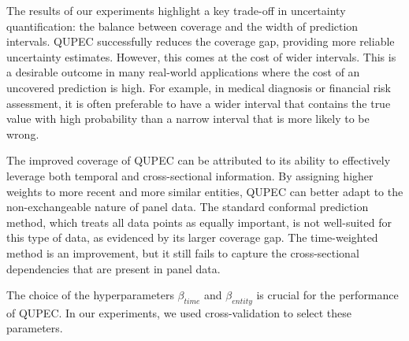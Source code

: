 The results of our experiments highlight a key trade-off in uncertainty quantification: the balance between coverage and the width of prediction intervals. QUPEC successfully reduces the coverage gap, providing more reliable uncertainty estimates. However, this comes at the cost of wider intervals. This is a desirable outcome in many real-world applications where the cost of an uncovered prediction is high. For example, in medical diagnosis or financial risk assessment, it is often preferable to have a wider interval that contains the true value with high probability than a narrow interval that is more likely to be wrong.

The improved coverage of QUPEC can be attributed to its ability to effectively leverage both temporal and cross-sectional information. By assigning higher weights to more recent and more similar entities, QUPEC can better adapt to the non-exchangeable nature of panel data. The standard conformal prediction method, which treats all data points as equally important, is not well-suited for this type of data, as evidenced by its larger coverage gap. The time-weighted method is an improvement, but it still fails to capture the cross-sectional dependencies that are present in panel data.

The choice of the hyperparameters $\beta_{time}$ and $\beta_{entity}$ is crucial for the performance of QUPEC. In our experiments, we used cross-validation to select these parameters.
